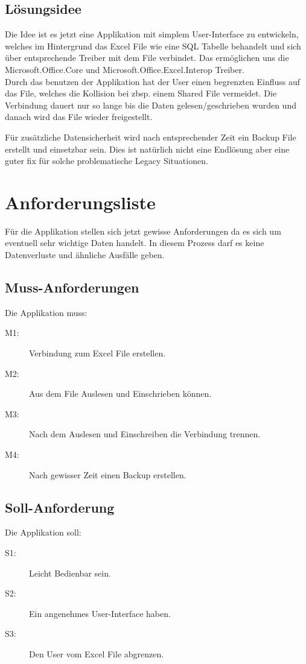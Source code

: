 \documentclass{article}
\begin{document}
\subsection{Lösungsidee}
Die Idee ist es jetzt eine Applikation mit simplem User-Interface zu entwickeln, welches im Hintergrund das Excel File wie eine SQL Tabelle behandelt und sich über entsprechende Treiber mit dem File verbindet. Das ermöglichen uns die Microsoft.Office.Core und Microsoft.Office.Excel.Interop Treiber. \\

Durch das benutzen der Applikation hat der User einen begrenzten Einfluss auf das File, welches die Kollision bei zbsp. einem Shared File vermeidet. Die Verbindung dauert nur so lange bis die Daten gelesen/geschrieben wurden und danach wird das File wieder freigestellt.

Für zusätzliche Datensicherheit wird nach entsprechender Zeit ein Backup File erstellt und einsetzbar sein. Dies ist natürlich nicht eine Endlösung aber eine guter fix für solche problematische Legacy Situationen.

\section{Anforderungsliste}
Für die Applikation stellen sich jetzt gewisse Anforderungen da es sich um eventuell sehr wichtige Daten handelt. In diesem Prozess darf es keine Datenverluste und ähnliche Ausfälle geben. 
	
\subsection{Muss-Anforderungen}
Die Applikation muss:
	\begin{description}
		\item[M1:] Verbindung zum Excel File erstellen.
		\item[M2:] Aus dem File Auslesen und Einschrieben können.
		\item[M3:] Nach dem Auslesen und Einschreiben die Verbindung trennen.
		\item[M4:] Nach gewisser Zeit einen  Backup erstellen.
	\end{description}

\subsection{Soll-Anforderung}
Die Applikation soll:
\begin{description}
	\item[S1:] Leicht Bedienbar sein.
	\item[S2:] Ein angenehmes User-Interface haben.
	\item[S3:] Den User vom Excel File abgrenzen.
\end{description}
\end{document}
